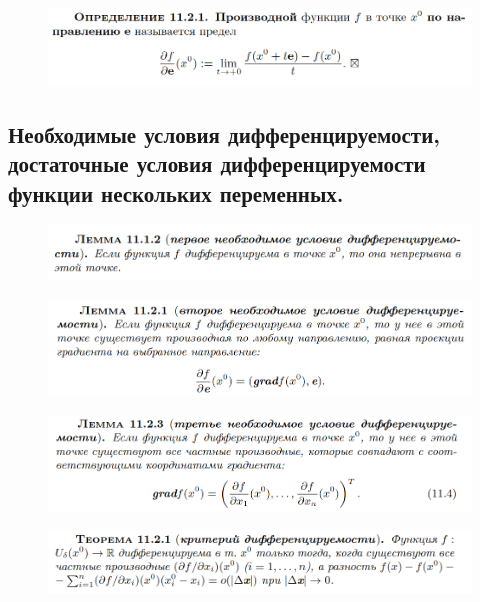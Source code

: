 \documentclass{article}
\begin{document}
\begin{figure}[h!]
    \centering
    \includegraphics[width=\textwidth]{35.png}
    \vspace{-1cm}
\end{figure}

\newpage
\subsection{Необходимые условия дифференцируемости, достаточные условия дифференцируемости функции нескольких переменных.}
\begin{figure}[h!]
    \centering
    \includegraphics[width=\textwidth]{36.png}
    \vspace{-1cm}
\end{figure}

\begin{figure}[h!]
    \centering
    \includegraphics[width=\textwidth]{37.png}
    \vspace{-1cm}
\end{figure}

\begin{figure}[h!]
    \centering
    \includegraphics[width=\textwidth]{38.png}
    \vspace{-1cm}
\end{figure}

\begin{figure}[h!]
    \centering
    \includegraphics[width=\textwidth]{39.png}
    \vspace{-1cm}
\end{figure}
\end{document}
